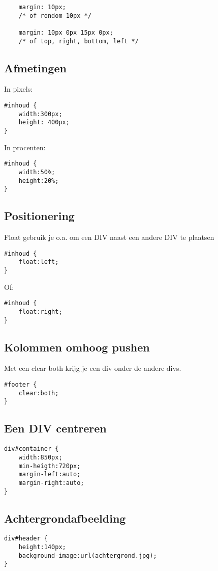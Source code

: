 \documentclass[8pt,pagesize,footinclude=false,headinclude=false]{scrartcl}
\begin{document}
\begin{multicols*}{4}
\begin{lstlisting}
	margin: 10px; 
	/* of rondom 10px */
	
	margin: 10px 0px 15px 0px; 
	/* of top, right, bottom, left */
\end{lstlisting}

\subsection*{Afmetingen}
In pixels:
\begin{lstlisting}
#inhoud {
	width:300px;
	height: 400px;
}
\end{lstlisting}

\noindent In procenten:
\begin{lstlisting}
#inhoud {
	width:50%;
	height:20%;
}
\end{lstlisting}

\subsection*{Positionering}
Float gebruik je o.a. om een DIV naast een andere DIV te plaatsen
\begin{lstlisting}
#inhoud {
	float:left;
}
\end{lstlisting}
\noindent Of:
\begin{lstlisting}
#inhoud {
	float:right;
}
\end{lstlisting}

\subsection*{Kolommen omhoog pushen}
Met een clear both krijg je een div onder de andere divs.
\begin{lstlisting}
#footer {
	clear:both;
}
\end{lstlisting}

\subsection*{Een DIV centreren}
\begin{lstlisting}
div#container {
	width:850px;
	min-heigth:720px;
	margin-left:auto;
	margin-right:auto;
}
\end{lstlisting}

\subsection*{Achtergrondafbeelding}
\begin{lstlisting}
div#header {
	height:140px;
	background-image:url(achtergrond.jpg);
}
\end{lstlisting}


\end{multicols*}
\end{document}
